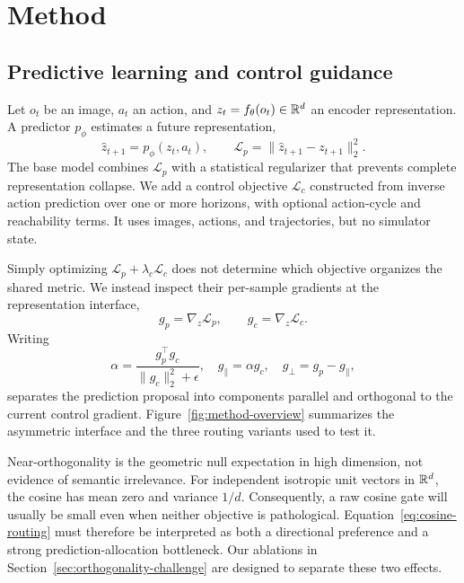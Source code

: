 \section{Method}

\subsection{Predictive learning and control guidance}

Let $o_t$ be an image, $a_t$ an action, and
$z_t=f_\theta(o_t)\in\mathbb{R}^d$ an encoder representation.  A predictor
$p_\phi$ estimates a future representation,
\begin{equation}
    \widehat z_{t+1}=p_\phi(z_t,a_t), \qquad
    \mathcal L_p=\|\widehat z_{t+1}-z_{t+1}\|_2^2.
\end{equation}
The base model combines $\mathcal L_p$ with a statistical regularizer that
prevents complete representation collapse.  We add a control objective
$\mathcal L_c$ constructed from inverse action prediction over one or more
horizons, with optional action-cycle and reachability terms.  It uses images,
actions, and trajectories, but no simulator state.

Simply optimizing $\mathcal L_p+\lambda_c\mathcal L_c$ does not determine which
objective organizes the shared metric.  We instead inspect their per-sample
gradients at the representation interface,
\begin{equation}
    g_p=\nabla_z\mathcal L_p, \qquad
    g_c=\nabla_z\mathcal L_c.
\end{equation}
Writing
\begin{equation}
    \alpha=\frac{g_p^\top g_c}{\|g_c\|_2^2+\epsilon},\quad
    g_{\parallel}=\alpha g_c,\quad
    g_\perp=g_p-g_{\parallel},
\end{equation}
separates the prediction proposal into components parallel and orthogonal to
the current control gradient.  Figure~\ref{fig:method-overview} summarizes the
asymmetric interface and the three routing variants used to test it.

Near-orthogonality is the geometric null expectation in high dimension, not
evidence of semantic irrelevance.  For independent isotropic unit vectors in
$\mathbb{R}^d$, the cosine has mean zero and variance $1/d$.  Consequently, a raw
cosine gate will usually be small even when neither objective is pathological.
Equation~\ref{eq:cosine-routing} must therefore be interpreted as both a
directional preference and a strong prediction-allocation bottleneck.  Our
ablations in Section~\ref{sec:orthogonality-challenge} are designed to separate
these two effects.

